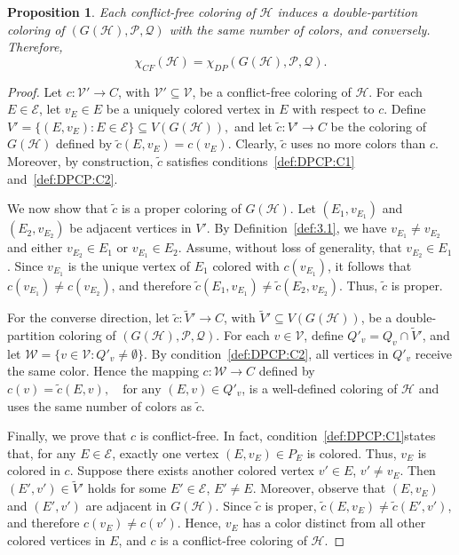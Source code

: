 \documentclass[preprint, 11pt, authoryear]{elsarticle}
\newtheorem{proposition}{Proposition}[section]
\newcommand{\hip}{{\mathcal H}}
\newcommand{\VV}{{\mathcal V}}
\newcommand{\EE}{{\mathcal E}}
\newcommand{\PP}{{\mathcal P}}
\newcommand{\QQ}{{\mathcal Q}}
\newcommand{\CG}[1]{G(#1)}
\newcommand{\cfcn}[1]{\chi_{CF}(#1)}
\newcommand{\dpcn}[1]{\chi_{DP}(#1)}
\begin{document}
 


\begin{proposition}\label{prop.cfcp.as.dpcp}
Each conflict-free coloring of $\hip$ induces a double-partition coloring of $(\CG{\hip}, \PP, \QQ)$ with the same number of colors, and conversely. Therefore, $$
\cfcn{\hip}=\dpcn{\CG{\hip}, \PP, \QQ}.
$$

\end{proposition}




\begin{proof}
Let $c:\VV' \to C$, with $\VV' \subseteq \VV$, be a conflict-free coloring of $\hip$. For each $E \in \EE$, let $v_E \in E$ be a uniquely colored vertex in $E$ with respect to $c$. Define 
$
V' = \{(E,v_E) : E \in \EE\} \subseteq V(\CG{\hip}),
$
and let $\tilde c:V' \to C$ be the coloring of $\CG{\hip}$ defined by $\tilde c(E,v_E) = c(v_E)$.
Clearly, $\tilde c$ uses no more colors than $c$. 
Moreover, by construction, $\tilde c$ satisfies conditions~\ref{def:DPCP:C1} and~\ref{def:DPCP:C2}.

We now show that $\tilde c$ is a proper coloring of $\CG{\hip}$. 
Let $(E_1,v_{E_1})$ and $(E_2,v_{E_2})$ be adjacent vertices in $V'$. 
By Definition~\ref{def:3.1}, we have $v_{E_1} \neq v_{E_2}$ and either $v_{E_2} \in E_1$ or $v_{E_1} \in E_2$. 
Assume, without loss of generality, that $v_{E_2} \in E_1$. 
Since $v_{E_1}$ is the unique vertex of $E_1$ colored with $c(v_{E_1})$, it follows that $c(v_{E_1}) \neq c(v_{E_2})$, and therefore $\tilde c(E_1,v_{E_1}) \neq \tilde c(E_2,v_{E_2})$. Thus, $\tilde c$ is proper.

For the converse direction, let $\tilde c:\tilde{V}' \to C$, with $\tilde{V}'  \subseteq V(\CG{\hip})$, 
be a double-partition coloring of $(\CG{\hip},\PP,\QQ)$. 
For each $v \in \VV$, define
$Q'_v = Q_v \cap \tilde{V}' $,
and let $\mathcal{W} = \{ v \in \VV : Q'_v \neq \emptyset \}$.
By condition~\ref{def:DPCP:C2}, all vertices in $Q'_v$ receive the same color. 
Hence the mapping $c:\mathcal{W} \to C$ defined by
$c(v) = \tilde c(E,v), \quad \text{for any } (E,v) \in Q'_v$,
is a well-defined coloring of $\hip$ and uses the same number of colors as $\tilde c$.

Finally, we prove that $c$ is conflict-free. In fact, condition~\ref{def:DPCP:C1}states that, for any $E \in \EE$, exactly one vertex $(E,v_E) \in P_E$ is colored. 
Thus, $v_E$ is colored in $c$. 
Suppose there exists another colored vertex $v' \in E$, $v' \neq v_E$. Then $(E',v') \in \tilde{V}'$ holds for some $E' \in \EE$,  $E' \neq E$. Moreover,  observe that
$(E,v_E)$ and $(E',v')$ are adjacent in $\CG{\hip}$.
Since $\tilde c$ is proper, $\tilde c(E,v_E) \neq \tilde c(E',v')$, and therefore $c(v_E) \neq c(v')$.
Hence, $v_E$ has a color distinct from all other colored vertices in $E$, 
and $c$ is a conflict-free coloring of $\hip$.
\end{proof}
\end{document}
